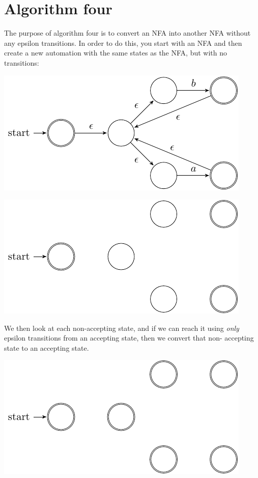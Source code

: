 \section{Algorithm four}

The purpose of algorithm four is to convert an NFA into another NFA without any
epsilon transitions. In order to do this, you start with an NFA and then create
a new automation with the same states as the NFA, but with no transitions:

\begin{center}
  \includegraphics{automata/22.pdf}
\end{center}

\begin{center}
  \includegraphics{automata/23.pdf}
\end{center}

We then look at each non-accepting state, and if we can reach it using {\it
only} epsilon transitions from an accepting state, then we convert that non-
accepting state to an accepting state.

\begin{center}
  \includegraphics{automata/24.pdf}
\end{center}

